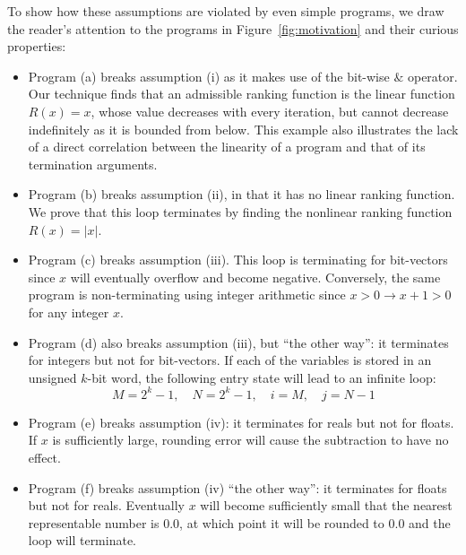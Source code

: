 \documentclass[a4paper]{llncs}
\begin{document}
To show how these assumptions are violated by even simple programs, we draw
the reader's attention to the programs in Figure~\ref{fig:motivation} and
their curious properties:
%
\begin{itemize}

\item Program (a) breaks assumption (i) as it makes use of the bit-wise $\&$ operator.
%
Our technique finds that an admissible ranking function is the linear
function $R(x) = x$, whose value decreases with every iteration, but cannot
decrease indefinitely as it is bounded from below.  This example also
illustrates the lack of a direct correlation between the linearity of a
program and that of its termination arguments.

\item Program (b) breaks assumption (ii), in that it has no linear ranking
function.  We prove that this loop terminates by finding the nonlinear
ranking function $R(x) = |x|$.

\item Program (c) breaks assumption (iii).  This loop is terminating for
bit-vectors since $x$ will eventually overflow and become negative. 
Conversely, the same program is non-terminating using integer arithmetic
since $x > 0 \rightarrow x+1 > 0$ for any integer $x$.

\item Program (d) also breaks assumption (iii), but ``the other way'': it
terminates for integers but not for bit-vectors.  If each of the variables
is stored in an unsigned $k$-bit word, the following entry state will lead
to an infinite loop:
%
$$ M = 2^k - 1,\quad N = 2^k - 1,\quad i = M,\quad j = N-1 $$

\item Program (e) breaks assumption (iv): it terminates for reals but not
for floats.  If $x$ is sufficiently large, rounding error will cause the
subtraction to have no effect.

\item Program (f) breaks assumption (iv) ``the other way'': it terminates
for floats but not for reals.  Eventually $x$ will become sufficiently small
that the nearest representable number is $0.0$, at which point it will be
rounded to $0.0$ and the loop will terminate.

\end{itemize}
\end{document}
